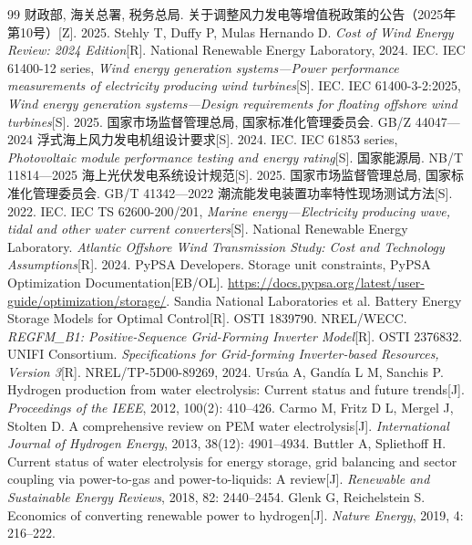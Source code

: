 \begin{thebibliography}{99}
 财政部, 海关总署, 税务总局. 关于调整风力发电等增值税政策的公告（2025年第10号）[Z]. 2025.
 Stehly T, Duffy P, Mulas Hernando D. \textit{Cost of Wind Energy Review: 2024 Edition}[R]. National Renewable Energy Laboratory, 2024.
 IEC. IEC 61400-12 series, \textit{Wind energy generation systems---Power performance measurements of electricity producing wind turbines}[S].
 IEC. IEC 61400-3-2:2025, \textit{Wind energy generation systems---Design requirements for floating offshore wind turbines}[S]. 2025.
 国家市场监督管理总局, 国家标准化管理委员会. GB/Z 44047---2024 浮式海上风力发电机组设计要求[S]. 2024.
 IEC. IEC 61853 series, \textit{Photovoltaic module performance testing and energy rating}[S].
 国家能源局. NB/T 11814---2025 海上光伏发电系统设计规范[S]. 2025.
 国家市场监督管理总局, 国家标准化管理委员会. GB/T 41342---2022 潮流能发电装置功率特性现场测试方法[S]. 2022.
 IEC. IEC TS 62600-200/201, \textit{Marine energy---Electricity producing wave, tidal and other water current converters}[S].
 National Renewable Energy Laboratory. \textit{Atlantic Offshore Wind Transmission Study: Cost and Technology Assumptions}[R]. 2024.
 PyPSA Developers. Storage unit constraints, PyPSA Optimization Documentation[EB/OL]. \url{https://docs.pypsa.org/latest/user-guide/optimization/storage/}.
 Sandia National Laboratories et al. Battery Energy Storage Models for Optimal Control[R]. OSTI 1839790.
 NREL/WECC. \textit{REGFM\_B1: Positive-Sequence Grid-Forming Inverter Model}[R]. OSTI 2376832.
 UNIFI Consortium. \textit{Specifications for Grid-forming Inverter-based Resources, Version 3}[R]. NREL/TP-5D00-89269, 2024.
 Ursúa A, Gandía L M, Sanchis P. Hydrogen production from water electrolysis: Current status and future trends[J]. \textit{Proceedings of the IEEE}, 2012, 100(2): 410--426.
 Carmo M, Fritz D L, Mergel J, Stolten D. A comprehensive review on PEM water electrolysis[J]. \textit{International Journal of Hydrogen Energy}, 2013, 38(12): 4901--4934.
 Buttler A, Spliethoff H. Current status of water electrolysis for energy storage, grid balancing and sector coupling via power-to-gas and power-to-liquids: A review[J]. \textit{Renewable and Sustainable Energy Reviews}, 2018, 82: 2440--2454.
 Glenk G, Reichelstein S. Economics of converting renewable power to hydrogen[J]. \textit{Nature Energy}, 2019, 4: 216--222.

\end{thebibliography}
